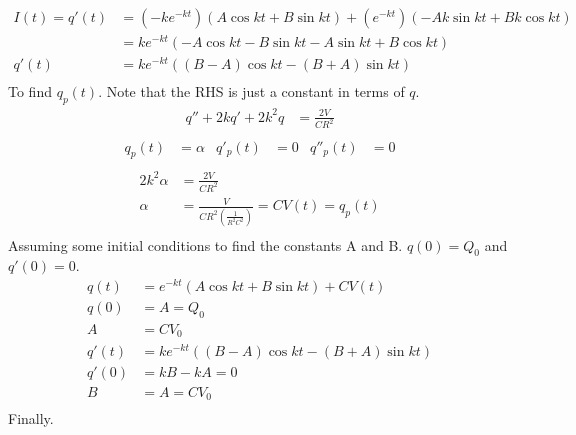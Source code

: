 \documentclass[]{article}
\begin{document}
{\begin{enumerate}
\begin{enumerate}
\begin{equation*}
\begin{split}
									I(t) = q'(t) &= (-ke^{-kt})(A \cos kt + B \sin kt) + (e^{-kt})(-Ak \sin kt + Bk \cos kt) \\
									&= ke^{-kt}(-A \cos kt - B \sin kt - A \sin kt + B \cos kt) \\
									q'(t) &= ke^{-kt}((B - A) \cos kt - (B + A) \sin kt) \\
								\end{split}
							\end{equation*}
							To find $q_p(t)$. Note that the RHS is just a constant in terms of $q$.
							\begin{equation*}
								\begin{split}
									q'' + 2kq' + 2k^2 q &= \frac{2V}{CR^2} \\
								\end{split}
							\end{equation*}
							\begin{equation*}
								\begin{aligned}
									q_p(t) &= \alpha & q'_p(t) &= 0 & q''_p(t) &= 0 \\
								\end{aligned}
							\end{equation*}
							\begin{equation*}
								\begin{split}
									2k^2 \alpha &= \frac{2V}{CR^2} \\
									\alpha &= \frac{V}{CR^2(\frac{1}{R^2C^2})} = CV(t) = q_p(t) \\
								\end{split}
							\end{equation*}
							Assuming some initial conditions to find the constants A and B. $q(0) = Q_0$ and $q'(0) = 0$.
							\begin{equation*}
								\begin{split}
									q(t) &= e^{-kt} ( A \cos kt + B \sin kt ) + CV(t) \\
									q(0) &= A = Q_0 \\
									A &= CV_0 \\
									q'(t) &= ke^{-kt}((B - A) \cos kt - (B + A) \sin kt) \\
									q'(0) &= kB - kA = 0 \\
									B &= A = CV_0 \\
								\end{split}
							\end{equation*}
							Finally.
							\begin{equation*}

\end{equation*}
\end{enumerate}
\end{enumerate}}
\end{document}
